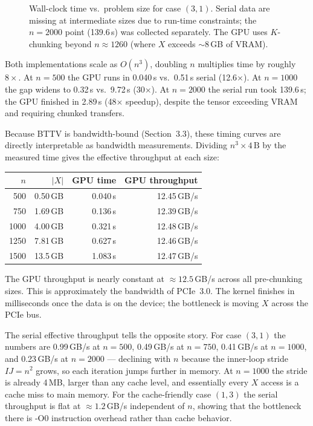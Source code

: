 \documentclass[11pt]{article}
\begin{document}
\begin{figure}[h]
\centering
\resizebox{0.85\linewidth}{!}{}
\caption{Wall-clock time vs.\ problem size for case $(3,1)$.
         Serial data are missing at intermediate sizes due to run-time
         constraints; the $n{=}2000$ point (139.6\,s) was collected
         separately.  The GPU uses $K$-chunking beyond $n{\approx}1260$
         (where $X$ exceeds ${\sim}8$\,GB of VRAM).}
\label{fig:size}
\end{figure}

Both implementations scale as $O(n^3)$, doubling $n$ multiplies time by
roughly $8{\times}$.  At $n{=}500$ the GPU runs in 0.040\,s vs.\ 0.51\,s
serial (12.6$\times$).  At $n{=}1000$ the gap widens to 0.32\,s vs.\
9.72\,s (30$\times$).  At $n{=}2000$ the serial run took 139.6\,s;
the GPU finished in 2.89\,s (48$\times$ speedup), despite the tensor
exceeding VRAM and requiring chunked transfers.

Because BTTV is bandwidth-bound (Section~3.3), these timing curves are
directly interpretable as bandwidth measurements.  Dividing
$n^3 \times 4\,\text{B}$ by the measured time gives the effective
throughput at each size:

\begin{center}
\begin{tabular}{rrrr}
\toprule
$n$ & $|X|$ & GPU time & GPU throughput \\
\midrule
500  & 0.50\,GB & 0.040\,s & 12.45\,GB/s \\
750  & 1.69\,GB & 0.136\,s & 12.39\,GB/s \\
1000 & 4.00\,GB & 0.321\,s & 12.48\,GB/s \\
1250 & 7.81\,GB & 0.627\,s & 12.46\,GB/s \\
1500 & 13.5\,GB & 1.083\,s & 12.47\,GB/s \\
\bottomrule
\end{tabular}
\end{center}

The GPU throughput is nearly constant at ${\approx}12.5$\,GB/s across all
pre-chunking sizes.  This is approximately the bandwidth of  PCIe~3.0.
The kernel finishes in milliseconds once the
data is on the device; the bottleneck is moving $X$ across the PCIe bus.

The serial effective throughput tells the opposite story.  For case $(3,1)$
the numbers are 0.99\,GB/s at $n{=}500$, 0.49\,GB/s at $n{=}750$,
0.41\,GB/s at $n{=}1000$, and 0.23\,GB/s at $n{=}2000$ --- declining
with $n$ because the inner-loop stride $IJ = n^2$ grows, so each iteration
jumps further in memory.  At $n{=}1000$ the stride is already 4\,MB,
larger than any cache level, and essentially every $X$ access is a cache
miss to main memory.  For the cache-friendly case $(1,3)$ the serial
throughput is flat at ${\approx}1.2$\,GB/s independent of $n$, showing
that the bottleneck there is -O0 instruction overhead rather than
cache behavior.
\end{document}
